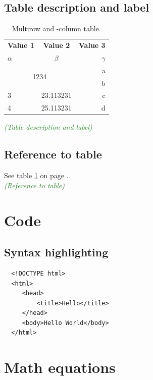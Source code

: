 \documentclass{article}
\newcommand{\ccheck}[1]{\textcolor{ForestGreen}{\emph{(\checkmark #1)}}} %
\begin{document}
\subsection{Table description and label}
\begin{table}[H]
  \begin{center}
    \caption{Multirow and -column table.}
    \label{tab:table1}
    \begin{tabular}{l|c|r}
      \textbf{Value 1} & \textbf{Value 2} & \textbf{Value 3}\\
      $\alpha$ & $\beta$ & $\gamma$ \\
      \hline
      \multicolumn{2}{c|}{\multirow{2}{*}{1234}} & a\\ %
      \multicolumn{2}{c|}{} & b\\ %
      \hline
      3 & 23.113231 & c\\
      4 & 25.113231 & d\\
    \end{tabular}
  \end{center}
\end{table}
\ccheck{Table description and label}

\subsection{Reference to table}
See table \ref{tab:table1} on page \pageref{tab:table1}.\\
\ccheck{Reference to table}


\section{Code}
\subsection{Syntax highlighting}
\begin{verbatim}
  <!DOCTYPE html>
  <html>
     <head>
         <title>Hello</title>
     </head>
     <body>Hello World</body>
  </html>
\end{verbatim}

\section{Math equations}
\end{document}
